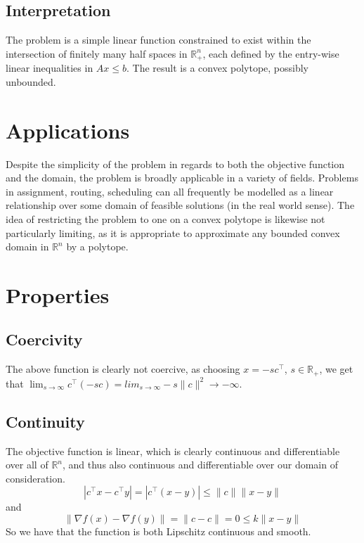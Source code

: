 \documentclass[letterpaper,twocolumn,12pt]{article}
\begin{document}
\subsection{Interpretation}
The problem is a simple linear function constrained to exist within the intersection
of finitely many half spaces in $\mathbb{R}_+^n$, each defined by the entry-wise
linear inequalities in $Ax\leq b$. The result is a convex polytope, possibly unbounded.

\section{Applications}
Despite the simplicity of the problem in regards to both the objective function and
the domain, the problem is broadly applicable in a variety of fields. Problems in
assignment, routing, scheduling can all frequently be modelled as a linear relationship
over some domain of feasible solutions (in the real world sense).
The idea of restricting the problem to one on a convex polytope is likewise not
particularly limiting, as it is appropriate to approximate any bounded convex domain in
$\mathbb{R}^n$ by a polytope\cite{Bronstein2008}.

\section{Properties}
\subsection{Coercivity}
The above function is clearly not coercive, as choosing $x=-sc^\intercal$, 
$s\in\mathbb{R}_+$, we get that 
$\lim_{s\to\infty} c^\intercal (-sc)=lim_{s\to\infty} -s\|c\|^2\to -\infty$.

\subsection{Continuity}
The objective function is linear, which is clearly continuous and differentiable
over all of $\mathbb{R}^n$, and thus also continuous and differentiable over our
domain of consideration. 
$$|c^\intercal x-c^\intercal y|=|c^\intercal(x-y)|\leq\|c\|\|x-y\|$$
and
$$\|\nabla f(x)-\nabla f(y)\|=\|c-c\|=0\leq k\|x-y\|$$
So we have that the function is both Lipschitz continuous and smooth.
\end{document}
